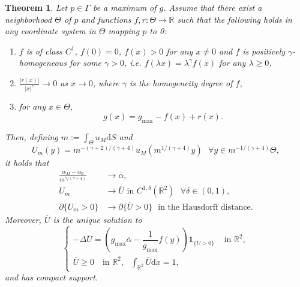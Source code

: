 \documentclass[10pt,a4paper]{article}
\newcommand{\gmax}{g_{\mathrm{max}}}
\newcommand{\RR}{\mathbb{R}}
\newcommand{\faskip}{\hspace{8pt}}
\newtheorem{mainthm}{Theorem}
\numberwithin{equation}{section}
\begin{document}
\begin{mainthm}
	\label{mainthm:isolated_hom}
	Let $ p \in \Gamma $ be a maximum of $ g $. Assume that there exist a neighborhood $\Theta$ of $ p $ and functions $ f,r: \Theta \rightarrow \RR $ such that the following holds in any coordinate system in $ \Theta $ mapping $ p $ to 0:
	\begin{enumerate}
		\item $ f $ is of class $ C^{1} $, $f(0) = 0$, $ f(x) > 0 $ for any $ x\neq 0 $ and $ f $ is positively $ \gamma $-homogeneous for some $ \gamma > 0 $, i.e. $ f(\lambda x) = \lambda^{\gamma} f(x) $ for any $ \lambda \geq 0 $,
		\item $ \frac{|r(x)|}{|x|^{\gamma}} \rightarrow 0$ as $ x\rightarrow 0 $, where $ \gamma $ is the homogeneity degree of $ f $,
		\item for any $ x \in \Theta $,
		\begin{equation}
		\label{eq:hyp_hom}
		g(x) = \gmax - f(x) + r(x).
		\end{equation}
	\end{enumerate}
	Then, defining $ m := \displaystyle\int_{\Theta} u_M \mathrm{d}S $ and 
	\[
		U_m(y) = m^{-(\gamma + 2)/(\gamma + 4)} u_M(m^{1/(\gamma + 4)}y) \faskip \forall y \in m^{-1/(\gamma + 4)} \Theta,
	\]
	it holds that  
	\begin{align*}
		\frac{\alpha_{M} - \alpha_0}{m^{\gamma/(\gamma + 4)}} &\rightarrow \overline{\alpha}, \\
		U_{m} &\rightarrow \overline{U} \text{ in }C^{1,\delta}(\RR^{2}) \faskip \forall \delta \in (0,1), \\ 
		\partial \{U_m > 0\} &\rightarrow \partial \{\overline{U} > 0\} \faskip \text{in the Hausdorff distance.}
	\end{align*}
	Moreover, $ \overline{U} $  is the unique solution to 
	\begin{equation}
		\label{eq:global}
		\begin{cases}
			-\Delta \overline{U} = \left( \gmax\overline{\alpha} - \dfrac{1}{\gmax}f(y) \right) \mathbb{1}_{\{\overline{U} > 0\}} & \text{ in }\RR^{2},\\
			\overline{U} \geq 0 \faskip \text{ in } \RR^{2}, \faskip \displaystyle\int_{\RR^{2}} \overline{U} \mathrm{d}x = 1, 
		\end{cases}
	\end{equation}
	and has compact support.
\end{mainthm}
\end{document}
